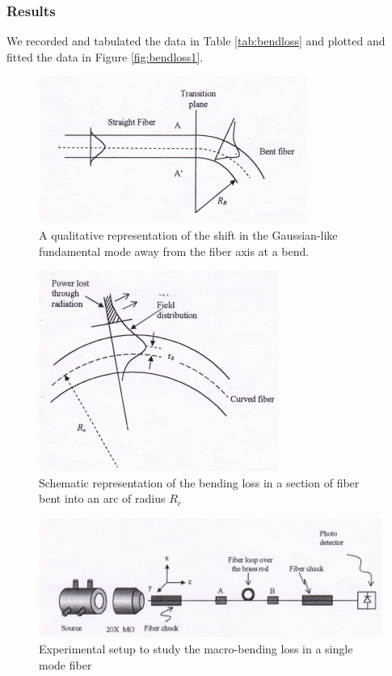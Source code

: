 \documentclass[%
 reprint,
nofootinbib,
 amsmath,amssymb,
 aps,
]{revtex4-2}
\begin{document}
\subsubsection*{\textbf{Results}}
We recorded and tabulated the data in Table \ref{tab:bendloss} and plotted and fitted the data in Figure \ref{fig:bendloss1}.
\begin{figure}
	\centering
	\includegraphics[scale = 0.65]{bend1}
	\caption{A qualitative representation of the shift in the Gaussian-like fundamental mode
		away from the fiber axis at a bend.}
	\label{fig:bend1}
\end{figure}
\begin{figure}
	\centering
	\includegraphics[scale=0.65]{bend2}
	\caption{Schematic representation of the bending loss in a section of fiber bent into an arc of radius $ R_c $}
	\label{fig:bend2}
\end{figure}
\begin{figure}
	\centering
	\includegraphics[scale=0.65]{bend3}
	\caption{Experimental setup to study the macro-bending loss in a single mode fiber}
	\label{fig:bend3}
\end{figure}
\end{document}
